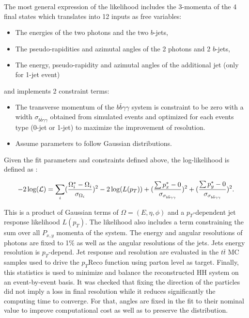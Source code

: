 The most general expression of the likelihood includes the 3-momenta of the 4 final states which translates into 12 inputs as free variables:
\begin{itemize}
    \item The energies of the two photons and the two $b$-jets,
    \item The pseudo-rapidities and azimutal angles of the 2 photons and 2 $b$-jets,
    \item The energy, pseudo-rapidity and azimutal angles of the additional jet (only for 1-jet event)
\end{itemize}
and implements 2 constraint terms:
\begin{itemize}
    \item The transverse momentum of the $b\bar{b}\gamma\gamma$ system is constraint to be zero with a width $\sigma_{b\bar{b}\gamma\gamma}$ obtained from simulated \HHyybb events and optimized for each events type (0-jet or 1-jet) to maximize the improvement of \mbb resolution.
    \item Assume parameters to follow Gaussian distributions.
\end{itemize}

Given the fit parameters and constraints defined above, the log-likelihood is defined as :

\begin{equation}
    \centering
    -2\log (\mathcal{L}) = \sum_{i} (\frac{\Omega_i^*-\Omega_i}{\sigma_{\Omega_i}})^2 - 2\log(L(p_T)) + (\frac{ \sum p_x^*-0}{\sigma_{\sigma_{b\bar{b}\gamma\gamma}}})^2 + (\frac{ \sum p_y^*-0}{\sigma_{\sigma_{b\bar{b}\gamma\gamma}}})^2.
\end{equation}

This is a product of Gaussian terms of $\Omega = (E, \eta, \phi)$ and a $p_T$-dependent jet response likelihood $L(p_T)$. The likelihood also includes a term constraining the sum over all $P_{x,y}$ momenta of the system. The energy and angular resolutions of photons are fixed to 1\% as well as the angular resolutions of the jets. Jets energy resolution is $p_T$-depend. Jet response and resolution are evaluated in the $t\bar{t}$ MC samples used to drive the $p_T$Reco function using parton level as target. Finally, this statistics is used to minimize and balance the reconstructed HH system on an event-by-event basis. It was checked that fixing the direction of the particles did not imply a loss in final resolution while it reduces significantly the computing time to converge. For that, angles are fixed in the fit to their nominal value to improve computational cost as well as to preserve the \myy distribution.  
